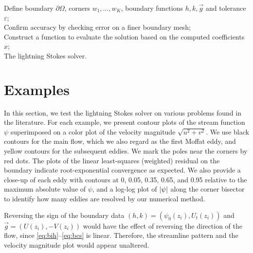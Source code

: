 \documentclass{article}
\begin{document}
\begin{algorithm}[H]
	\SetAlgoLined
   Define boundary $\partial \Omega$, corners $w_1,\ldots,w_K$, boundary
   functions $h,k,\vec{g}$ and tolerance $\varepsilon$;\\
	Confirm accuracy by checking error on a finer boundary mesh;\\
	Construct a function to evaluate the solution based on the computed coefficients $x$;\\
	\caption{The lightning Stokes solver.}
\end{algorithm}

\section{Examples \label{sec:results}}

In this section, we test the lightning Stokes solver on various problems found
in the literature. For each example, we present contour plots of the stream
function $\psi$ superimposed on a color plot of the velocity magnitude
$\sqrt{u^2+v^2}$. We use black contours for the main flow, which we also regard
as the first Moffat eddy, and yellow contours for the subsequent eddies. We
mark the poles near the corners by red dots. The plots of the linear
least-squares (weighted) residual on the boundary indicate root-exponential
convergence as expected. We also provide a close-up of each eddy with contours
at 0, 0.05, 0.35, 0.65, and 0.95 relative to the maximum absolute value of
$\psi$, and a log-log plot of $\abs{\psi}$ along the corner bisector to
identify how many eddies are resolved by our numerical method.

Reversing the sign of the boundary data $(h,k)=(\psi_0(z_i), U_t(z_i))$ and
$\vec{g}=(U(z_i), -V(z_i))$ would have the effect of reversing the direction of
the flow, since \eqref{eq:bih}--\eqref{eq:bcs} is linear. Therefore, the
streamline pattern and the velocity magnitude plot would appear unaltered.
\end{document}
